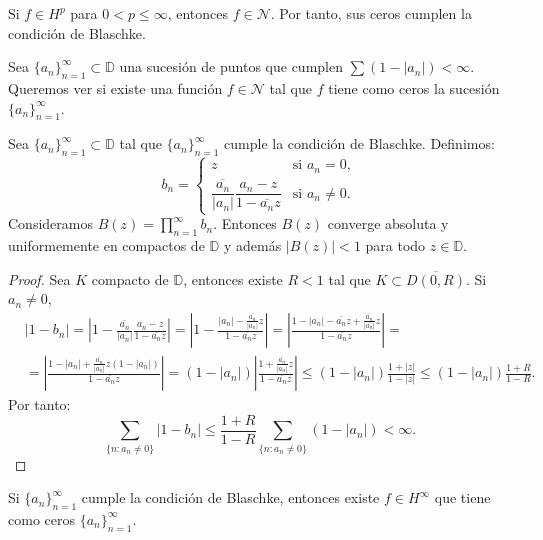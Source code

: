 \begin{remark}
    Si $f \in H^p$ para $0 < p \leq \infty$, entonces $f \in \mathcal{N}$.
    Por tanto, sus ceros cumplen la condición de Blaschke.
\end{remark}

Sea $\{a_n\}_{n=1}^\infty \subset \mathbb{D}$ una sucesión de puntos que cumplen $\sum (1-|a_n|) < \infty$.
Queremos ver si existe una función $f \in \mathcal{N}$ tal que $f$ tiene como ceros la sucesión $\{a_n\}_{n=1}^\infty$.

\begin{theorem}
    Sea $\{a_n\}_{n=1}^\infty \subset \mathbb{D}$ tal que $\{a_n\}_{n=1}^\infty$ cumple la condición de Blaschke.
    Definimos:
    $$b_n = \begin{cases}
            z                                                             & \text{si } a_n = 0,    \\
            \dfrac{\overline{a_n}}{|a_n|}\dfrac{a_n-z}{1-\overline{a_n}z} & \text{si } a_n \neq 0.
        \end{cases}$$
    Consideramos $B(z) = \prod_{n=1}^\infty b_n$.
    Entonces $B(z)$ converge absoluta y uniformemente en compactos de $\mathbb{D}$ y además $|B(z)| < 1$ para todo $z \in \mathbb{D}$.
\end{theorem}

\begin{proof}
    Sea $K$ compacto de $\mathbb{D}$, entonces existe $R < 1$ tal que $K \subset \overline{D(0, R)}$.
    Si $a_n \neq 0$,
    \begin{align*}
         & |1-b_n| = \left|1 - \frac{\overline{a_n}}{|a_n|}\frac{a_n-z}{1-\overline{a_n}z}\right| = \left|1 - \frac{|a_n| - \frac{\overline{a_n}}{|a_n|}z}{1-\overline{a_n}z}\right| = \left|\frac{1 - |a_n| - \overline{a_n}z + \frac{\overline{a_n}}{|a_n|}z}{1 - \overline{a_n}z}\right| = \\
         & = \left|\frac{1-|a_n| + \frac{\overline{a_n}}{|a_n|}z(1-|a_n|)}{1-\overline{a_n}z}\right| = (1-|a_n|) \left|\frac{1 + \frac{\overline{a_n}}{|a_n|}z}{1-\overline{a_n}z}\right| \leq (1-|a_n|)\frac{1+|z|}{1-|z|} \leq (1-|a_n|)\frac{1+R}{1-R}.
    \end{align*}
    Por tanto:
    $$\sum_{\{n : a_n \neq 0\}} |1-b_n| \leq \frac{1+R}{1-R} \sum_{\{n : a_n \neq 0\}} (1-|a_n|) < \infty.$$
\end{proof}

\begin{remark}
    Si $\{a_n\}_{n=1}^\infty$ cumple la condición de Blaschke, entonces existe $f \in H^\infty$ que tiene como ceros $\{a_n\}_{n=1}^\infty$.
\end{remark}

